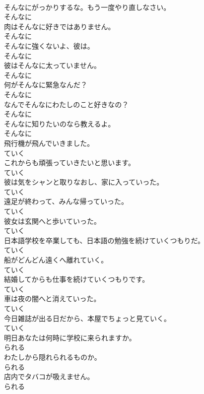 \documentclass[8pt]{extreport}
\begin{document}
\begin{CJK}{UTF8}{min}
\\	そんなにがっかりするな。もう一度やり直しなさい。	
\\	そんなに
\\	肉はそんなに好きではありません。	
\\	そんなに
\\	そんなに強くないよ、彼は。	
\\	そんなに
\\	彼はそんなに太っていません。	
\\	そんなに
\\	何がそんなに緊急なんだ？	
\\	そんなに
\\	なんでそんなにわたしのこと好きなの？	
\\	そんなに
\\	そんなに知りたいのなら教えるよ。	
\\	そんなに
\\	飛行機が飛んでいきました。	
\\	ていく
\\	これからも頑張っていきたいと思います。	
\\	ていく
\\	彼は気をシャンと取りなおし、家に入っていった。	
\\	ていく
\\	遠足が終わって、みんな帰っていった。	
\\	ていく
\\	彼女は玄関へと歩いていった。	
\\	ていく
\\	日本語学校を卒業しても、日本語の勉強を続けていくつもりだ。	
\\	ていく
\\	船がどんどん遠くへ離れていく。	
\\	ていく
\\	結婚してからも仕事を続けていくつもりです。	
\\	ていく
\\	車は夜の闇へと消えていった。	
\\	ていく
\\	今日雑誌が出る日だから、本屋でちょっと見ていく。	
\\	ていく
\\	明日あなたは何時に学校に来られますか。	
\\	られる
\\	わたしから隠れられるものか。	
\\	られる
\\	店内でタバコが吸えません。	
\\	られる

\end{CJK}
\end{document}
